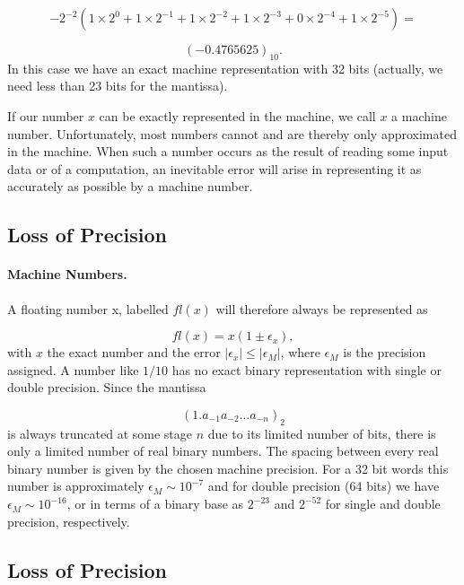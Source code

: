 \documentclass[%
oneside,                 %
final,                   %
10pt]{article}
\begin{document}
{{{{{\[
 -2^{-2}\left(1\times 2^0+1\times 2^{-1}+
1\times 2^{-2}+1\times 2^{-3}+0\times 2^{-4}+1\times 2^{-5}\right)=\]

\[
(-0.4765625)_{10}.
\]
In this case we have an exact machine representation with 32 bits (actually, we need less than
23 bits for the mantissa).

If our number $x$ can be exactly represented in the machine, we call
$x$ a machine number. Unfortunately, most numbers cannot  and are thereby
only approximated in the machine. When such a number occurs as the result
of reading some input data or of a computation, an inevitable error
will arise in representing it as accurately as possible by
a machine number.



\subsection{Loss of Precision}


\paragraph{Machine Numbers.}
A floating number x, labelled $fl(x)$ will therefore always be represented as

\begin{equation}
  fl(x) = x(1\pm \epsilon_x),
\end{equation}
with $x$ the exact number and the error $|\epsilon_x| \le |\epsilon_M|$, where
$\epsilon_M$ is the precision assigned. A number like $1/10$ has no exact binary representation
with single or double precision. Since the mantissa

\[
\left(1.a_{-1}a_{-2}\dots a_{-n}\right)_2
\]
is always truncated at some stage $n$ due to its limited number of bits, there is only a
limited number of real binary numbers. The spacing between every real binary number is given by the
chosen machine precision.
For a 32 bit words this number is approximately
$ \epsilon_M \sim 10^{-7}$ and for double precision (64 bits) we have
$ \epsilon_M \sim 10^{-16}$, or in terms of a binary base
as $2^{-23}$ and $2^{-52}$ for single and double precision, respectively.



\subsection{Loss of Precision}


}}}}}
\end{document}
